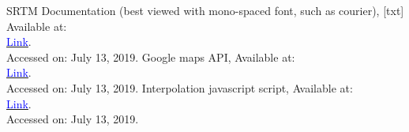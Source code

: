 \documentclass[peerreview]{IEEEtran}
\begin{document}
\begin{thebibliography}{1}
SRTM Documentation (best viewed with mono-spaced font, such as courier), [txt] Available at:\\ \href{https://dds.cr.usgs.gov/srtm/version1/Documentation/SRTM_Topo.txt}{\underline{\textcolor{blue}{Link}}}.\\Accessed on: July 13, 2019.
Google maps API, Available at:\\ \href{https://cloud.google.com/maps-platform/}{\underline{\textcolor{blue}{Link}}}.\\Accessed on: July 13, 2019.
Interpolation javascript script, Available at:\\ \href{https://www.danbp.org/p/en/node/53}{\underline{\textcolor{blue}{Link}}}.\\Accessed on: July 13, 2019.
\end{thebibliography}
\end{document}

